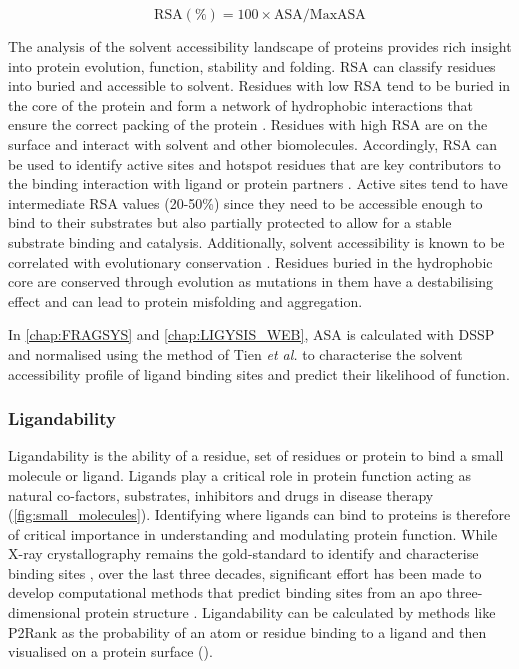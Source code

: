 \begin{equation}
\text{RSA} (\%) = 100 \times \text{ASA}/\text{MaxASA}
\label{eq:RSA}
\end{equation}

\vspace{-13pt} %

The analysis of the solvent accessibility landscape of proteins provides rich insight into protein evolution, function, stability and folding. RSA can classify residues into buried and accessible to solvent. Residues with low RSA tend to be buried in the core of the protein and form a network of hydrophobic interactions that ensure the correct packing of the protein \cite{DILL_1990_FOLDING}. Residues with high RSA are on the surface and interact with solvent and other biomolecules. Accordingly, RSA can be used to identify active sites and hotspot residues that are key contributors to the binding interaction with ligand or protein partners \cite{JONES_1997_PROTINTERS}. Active sites tend to have intermediate RSA values (20-50\%) since they need to be accessible enough to bind to their substrates but also partially protected to allow for a stable substrate binding and catalysis. Additionally, solvent accessibility is known to be correlated with evolutionary conservation \cite{GOLDMAN_1998_SS_RSA_EVO}. Residues buried in the hydrophobic core are conserved through evolution as mutations in them have a destabilising effect and can lead to protein misfolding and aggregation.

In \autoref{chap:FRAGSYS} and \autoref{chap:LIGYSIS_WEB}, ASA is calculated with DSSP \cite{KABSCH_1983_DSSP} and normalised using the method of Tien \textit{et al.} \cite{TIEN_2013_RSA} to characterise the solvent accessibility profile of ligand binding sites and predict their likelihood of function.

\subsubsection{Ligandability}

Ligandability is the ability of a residue, set of residues or protein to bind a small molecule or ligand. Ligands play a critical role in protein function acting as natural co-factors, substrates, inhibitors and drugs in disease therapy (\autoref{fig:small_molecules}). Identifying where ligands can bind to proteins is therefore of critical importance in understanding and modulating protein function. While X-ray crystallography remains the gold-standard to identify and characterise binding sites \cite{REES_2004_FBLD}, over the last three decades, significant effort has been made to develop computational methods that predict binding sites from an apo three-dimensional protein structure \cite{VOLKAMER_2010_TOPOLOGY}. Ligandability can be calculated by methods like P2Rank \cite{KRIVAK_2018_P2RANK} as the probability of an atom or residue binding to a ligand and then visualised on a protein surface ().

